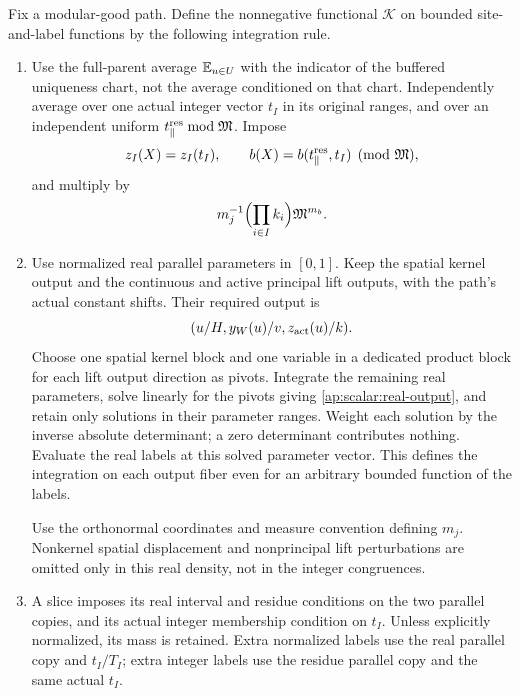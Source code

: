 Fix a modular-good path. Define the nonnegative functional $\mathcal K$
on bounded site-and-label functions by the following integration rule.
\begin{enumerate}
\item Use the full-parent average $\mathbb E_{u\in U}$ with the indicator of
the buffered uniqueness chart, not the average conditioned on that
chart. Independently average over one actual
integer vector $t_I$ in its original ranges, and over an independent
uniform $t_\parallel^{\rm res}\bmod\mathfrak M$. Impose
\begin{equation}\label{ap:scalar:incidence}
 z_I(X)=z_I(t_I),\qquad
 b(X)=b(t_\parallel^{\rm res},t_I)\pmod{\mathfrak M},
\end{equation}
and multiply by
\begin{equation}\label{ap:scalar:normalization}
                   m_j^{-1}\Bigl(\prod_{i\in I}k_i\Bigr)
                                  \mathfrak M^{m_b}.
\end{equation}
\item Use normalized real parallel parameters in $[0,1]$. Keep the
spatial kernel output and the continuous and active principal lift
outputs, with the path's actual constant shifts. Their required output is
\begin{equation}\label{ap:scalar:real-output}
                (u/H,y_W(u)/v,z_{\rm act}(u)/k).
\end{equation}
Choose one spatial kernel block and one variable in a dedicated
product block for each lift output direction as pivots. Integrate
the remaining real parameters, solve linearly for the pivots giving
\eqref{ap:scalar:real-output}, and retain only solutions in their
parameter ranges. Weight each solution by the inverse absolute
determinant; a zero determinant contributes nothing. Evaluate the
real labels at this solved parameter vector. This defines the
integration on each output fiber even for an arbitrary bounded
function of the labels.

Use the orthonormal coordinates and measure convention defining $m_j$.
Nonkernel spatial displacement and nonprincipal lift perturbations
are omitted only in this real density, not in the integer congruences.
\item A slice imposes its real interval and residue conditions on the
two parallel copies, and its actual integer membership condition on
$t_I$. Unless explicitly normalized, its mass is retained. Extra
normalized labels use the real parallel copy and $t_I/T_I$; extra
integer labels use the residue parallel copy and the same actual
$t_I$.
\end{enumerate}

